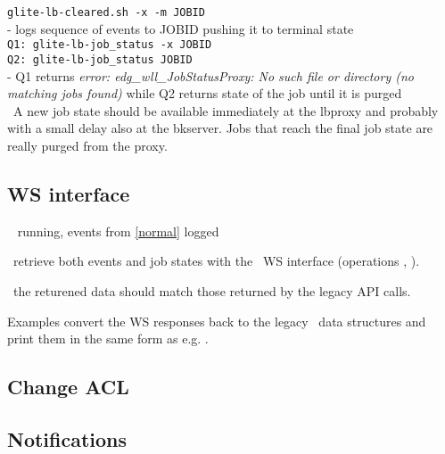 {\tt glite-lb-cleared.sh -x -m JOBID} \\
- logs sequence of events to JOBID pushing it to terminal state \\

{\tt Q1: glite-lb-job\_status -x JOBID } \\
{\tt Q2: glite-lb-job\_status JOBID } \\
- Q1 returns {\em error: edg\_wll\_JobStatusProxy: No such file or directory (no matching jobs found)} while Q2 returns state of the job until it is purged \\

\result\ A new job state should be available immediately at the
lbproxy and probably with a small delay also at the bkserver. Jobs that reach the final job state
are really purged from the proxy.



\subsection{WS interface}
\req\  running, events from \ref{normal} logged

\how\ retrieve both events and job states with the \LB\ WS interface
(operations , ).

\result\ the returened data should match those returned by the legacy
API calls.

\begin{hints}
Examples  convert the WS
responses back to the legacy \LB\ data structures and print them in
the same form as e.g. .
\end{hints}



\subsection{Change ACL}




\subsection{Notifications}



